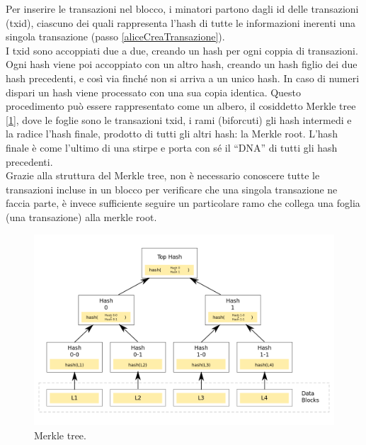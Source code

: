 \begin{enumerate}
Per inserire le transazioni nel blocco, i minatori partono dagli id delle transazioni (txid), ciascuno dei quali rappresenta l’hash di tutte le informazioni inerenti una singola transazione (passo \ref{aliceCreaTransazione}).
\\I txid sono accoppiati due a due, creando un hash per ogni coppia di transazioni. Ogni hash viene poi accoppiato con un altro hash, creando un hash figlio dei due hash precedenti, e così via finché non si arriva a un unico hash. In caso di numeri dispari un hash viene processato con una sua copia identica. Questo procedimento può essere rappresentato come un albero, il cosiddetto Merkle tree [\ref{fig:merkelTree}],  dove le foglie sono le transazioni txid, i rami (biforcuti) gli hash intermedi e la radice l’hash finale, prodotto di tutti gli altri hash: la Merkle root. L’hash finale è come l’ultimo di una stirpe e porta con sé il “DNA” di tutti gli hash precedenti\cite{merkle-tree}.
\\Grazie alla struttura del Merkle tree, non è necessario conoscere tutte le transazioni incluse in un blocco per verificare che una singola transazione ne faccia parte, è invece sufficiente seguire un particolare ramo che collega una foglia (una transazione) alla merkle root.
\begin{figure}[H]
	\centering
	\includegraphics[width=\textwidth]{images/merkle_tree.png}
	\caption{Merkle tree.}
	\label{fig:merkelTree}
\end{figure}


\end{enumerate}
